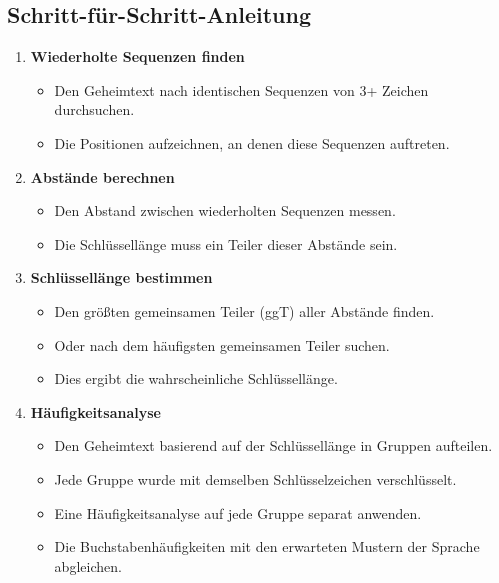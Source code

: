 \documentclass[
  nswissgerman,
  a4paper,
  DIV=11,
  numbers=noendperiod,
  ngerman]{scrreprt}
\providecommand{\tightlist}{%
  \setlength{\itemsep}{0pt}\setlength{\parskip}{0pt}}
\begin{document}
\subsection{Schritt-für-Schritt-Anleitung}\label{schritt-fuxfcr-schritt-anleitung}

\begin{enumerate}
\def\labelenumi{\arabic{enumi}.}
\tightlist
\item
  \textbf{Wiederholte Sequenzen finden}

  \begin{itemize}
  \tightlist
  \item
    Den Geheimtext nach identischen Sequenzen von 3+ Zeichen
    durchsuchen.
  \item
    Die Positionen aufzeichnen, an denen diese Sequenzen auftreten.
  \end{itemize}
\item
  \textbf{Abstände berechnen}

  \begin{itemize}
  \tightlist
  \item
    Den Abstand zwischen wiederholten Sequenzen messen.
  \item
    Die Schlüssellänge muss ein Teiler dieser Abstände sein.
  \end{itemize}
\item
  \textbf{Schlüssellänge bestimmen}

  \begin{itemize}
  \tightlist
  \item
    Den größten gemeinsamen Teiler (ggT) aller Abstände finden.
  \item
    Oder nach dem häufigsten gemeinsamen Teiler suchen.
  \item
    Dies ergibt die wahrscheinliche Schlüssellänge.
  \end{itemize}
\item
  \textbf{Häufigkeitsanalyse}

  \begin{itemize}
  \tightlist
  \item
    Den Geheimtext basierend auf der Schlüssellänge in Gruppen
    aufteilen.
  \item
    Jede Gruppe wurde mit demselben Schlüsselzeichen verschlüsselt.
  \item
    Eine Häufigkeitsanalyse auf jede Gruppe separat anwenden.
  \item
    Die Buchstabenhäufigkeiten mit den erwarteten Mustern der Sprache
    abgleichen.
  \end{itemize}
\end{enumerate}
\end{document}
